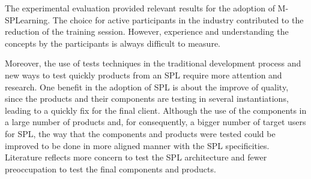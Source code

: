 \begin{itemize}
The experimental evaluation provided relevant results for the adoption of M-SPLear\allowbreak ning. The choice for active participants in the industry contributed to the reduction of the training session. However, experience and understanding the concepts by the participants is always difficult to measure.

Moreover, the use of tests techniques in the traditional development process and new ways to test quickly products from an SPL require more attention and research. One benefit in the adoption of SPL is about the improve of quality, since the products and their components are testing in several instantiations, leading to a quickly fix for the final client. Although the use of the components in a large number of products and, for consequently, a bigger number of target users for SPL, the way that the components and products were tested could be improved to be done in more aligned manner with the SPL specificities. Literature reflects more concern to test the SPL architecture and fewer preoccupation to test the final components and products.
\end{itemize}
